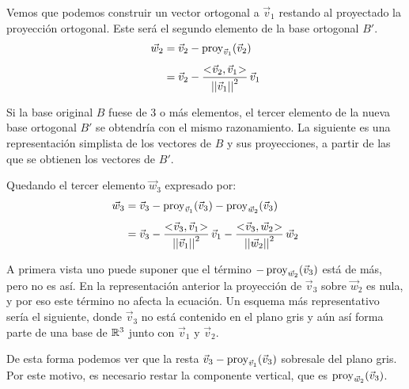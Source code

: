 \documentclass[a5paper,12pt,twoside]{book}
\begin{document}
\begin{center}
    \def\svgwidth{0.6\linewidth}
    
\end{center}

Vemos que podemos construir un vector ortogonal a $\Vec{v}_1$ restando al proyectado la proyección ortogonal.
Este será el segundo elemento de la base ortogonal $B'$.
\begin{align*}
    \Vec{w}_2 &= \Vec{v}_2 - \operatorname{proy}_{\Vec{v}_1}(\Vec{v}_2)
    \\[1ex]
    &= \Vec{v}_2 - \frac{<\hspace{-0.8mm}\Vec{v}_2,\Vec{v}_1\hspace{-0.8mm}>}{{\left|\left| {\Vec{v}_1} \right|\right|}^2} \, \Vec{v}_1
\end{align*}

Si la base original $B$ fuese de 3 o más elementos, el tercer elemento de la nueva base ortogonal $B'$ se obtendría con el mismo razonamiento.
La siguiente es una representación simplista de los vectores de $B$ y sus proyecciones, a partir de las que se obtienen los vectores de $B'$.

\begin{center}
    \def\svgwidth{0.6\linewidth}
    
\end{center}

Quedando el tercer elemento $\Vec{w}_3$ expresado por:
\begin{align*}
    \Vec{w}_3 &= \Vec{v}_3 - \operatorname{proy}_{\Vec{v}_1}(\Vec{v}_3) - \operatorname{proy}_{\Vec{w}_2}(\Vec{v}_3)
    \\[1ex]
    &= \Vec{v}_3 - \frac{<\hspace{-0.8mm}\Vec{v}_3,\Vec{v}_1\hspace{-0.8mm}>}{{\left|\left| {\Vec{v}_1} \right|\right|}^2} \, \Vec{v}_1 - \frac{<\hspace{-0.8mm}\Vec{v}_3,\Vec{w}_2\hspace{-0.8mm}>}{{\left|\left| {\Vec{w}_2} \right|\right|}^2} \, \Vec{w}_2
\end{align*}

A primera vista uno puede suponer que el término $-\operatorname{proy}_{\Vec{w}_2}(\Vec{v}_3)$ está de más, pero no es así.
En la representación anterior la proyección de $\Vec{v}_3$ sobre $\Vec{w}_2$ es nula, y por eso este término no afecta la ecuación.
Un esquema más representativo sería el siguiente, donde $\Vec{v}_3$ no está contenido en el plano gris y aún así forma parte de una base de $\mathbb{R}^3$ junto con $\Vec{v}_1$ y $\Vec{v}_2$.

\begin{center}
    \def\svgwidth{0.7\linewidth}
    
\end{center}

De esta forma podemos ver que la resta $\Vec{v}_3-\operatorname{proy}_{\Vec{v}_1}(\Vec{v}_3)$ sobresale del plano gris.
Por este motivo, es necesario restar la componente vertical, que es $\operatorname{proy}_{\Vec{w}_2}(\Vec{v}_3)$.
\end{document}
